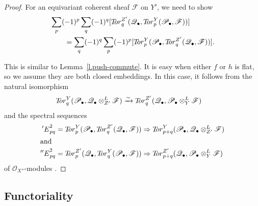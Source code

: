 \documentclass[11pt]{amsart}
\theoremstyle{definition}
\begin{document}
\begin{proof}
For an equivariant coherent sheaf ${\mathscr{F}}$ on $Y'$, we need to show
\begin{align}\label{e.bigsum}
\begin{aligned}
 & \sum_p (-1)^p \sum_q (-1)^q [{T\hspace{-.6ex}or}^{Z'}_q({\mathscr{Q}}_\bullet,{T\hspace{-.6ex}or}^Y_p({\mathscr{P}}_\bullet,{\mathscr{F}}))] \\ &\qquad = \sum_q (-1)^q \sum_p (-1)^p [{T\hspace{-.6ex}or}^Y_p({\mathscr{P}}_\bullet,{T\hspace{-.6ex}or}^{Z'}_q({\mathscr{Q}}_\bullet,{\mathscr{F}}))] .
\end{aligned}
\end{align}

This is similar to Lemma~\ref{l.push-commute}.  It is easy when either $f$ or $h$ is flat, so we assume they are both closed embeddings.  In this case, it follows from the natural isomorphism
\begin{align*}
 {T\hspace{-.6ex}or}^Y_q( {\mathscr{P}}_\bullet, {\mathscr{Q}}_\bullet \otimes^L_{Z'} {\mathscr{F}} ) &\xrightarrow{\sim} {T\hspace{-.6ex}or}^{Z'}_q( {\mathscr{Q}}_\bullet, {\mathscr{P}}_\bullet \otimes^L_Y {\mathscr{F}} )
\end{align*}
and the spectral sequences
\begin{align*}
 {'E}^2_{pq} = {T\hspace{-.6ex}or}^{Y}_p( {\mathscr{P}}_\bullet, {T\hspace{-.6ex}or}^{Z'}_q( {\mathscr{Q}}_\bullet, {\mathscr{F}} ) ) & \Rightarrow {T\hspace{-.6ex}or}^Y_{p+q}( {\mathscr{P}}_\bullet, {\mathscr{Q}}_\bullet \otimes^L_{Z'} {\mathscr{F}} ) \\
 \intertext{and}
 {''E}^2_{pq} = {T\hspace{-.6ex}or}^{Z'}_p( {\mathscr{Q}}_\bullet, {T\hspace{-.6ex}or}^Y_q( {\mathscr{P}}_\bullet, {\mathscr{F}} ) ) & \Rightarrow {T\hspace{-.6ex}or}^{Z'}_{p+q}( {\mathscr{Q}}_\bullet, {\mathscr{P}}_\bullet \otimes^L_Y {\mathscr{F}} )
\end{align*}
of ${\mathcal{O}}_{X''}$-modules \cite[Lemma~1.5.2]{ks}.
\end{proof}

\subsection{Functoriality}
\end{document}
